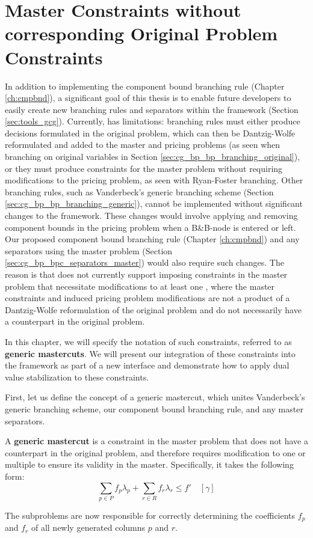 \chapter{Master Constraints without corresponding Original Problem Constraints}\label{ch:gm}
In addition to implementing the component bound branching rule (Chapter \ref{ch:cmpbnd}), a significant goal of this thesis is to enable future \GCG{} developers to easily create new branching rules and separators within the framework (Section \ref{sec:tools_gcg}). Currently, \GCG{} has limitations: branching rules must either produce decisions formulated in the original problem, which can then be Dantzig-Wolfe reformulated and added to the master and pricing problems (as seen when branching on original variables in Section \ref{sec:cg_bp_bp_branching_original}), or they must produce constraints for the master problem without requiring modifications to the pricing problem, as seen with Ryan-Foster branching. Other branching rules, such as Vanderbeck's generic branching scheme (Section \ref{sec:cg_bp_bp_branching_generic}), cannot be implemented without significant changes to the \GCG{} framework. These changes would involve applying and removing component bounds in the pricing problem when a B\&B-node is entered or left. Our proposed component bound branching rule (Chapter \ref{ch:cmpbnd}) and any separators using the master problem (Section \ref{sec:cg_bp_bpc_separators_master}) would also require such changes. The reason is that \GCG{} does not currently support imposing constraints in the master problem that necessitate modifications to at least one \SP{}, where the master constraints and induced pricing problem modifications are not a product of a Dantzig-Wolfe reformulation of the original problem and do not necessarily have a counterpart in the original problem.

In this chapter, we will specify the notation of such constraints, referred to as \textbf{generic mastercuts}. We will present our integration of these constraints into the \GCG{} framework as part of a new interface and demonstrate how to apply dual value stabilization to these constraints.

First, let us define the concept of a generic mastercut, which unites Vanderbeck's generic branching scheme, our component bound branching rule, and any master separators.

\begin{definition}
A \textbf{generic mastercut} is a constraint in the master problem that does not have a counterpart in the original problem, and therefore requires modification to one or multiple \SP{} to ensure its validity in the master. Specifically, it takes the following form:
\begin{equation*}
\sum_{p \in P} f_p \lambda_p + \sum_{r \in R} f_r \lambda_r \leq f' \quad \left[\gamma\right]
\end{equation*}

The subproblems are now responsible for correctly determining the coefficients $f_p$ and $f_r$ of all newly generated columns $p$ and $r$.
\end{definition}

